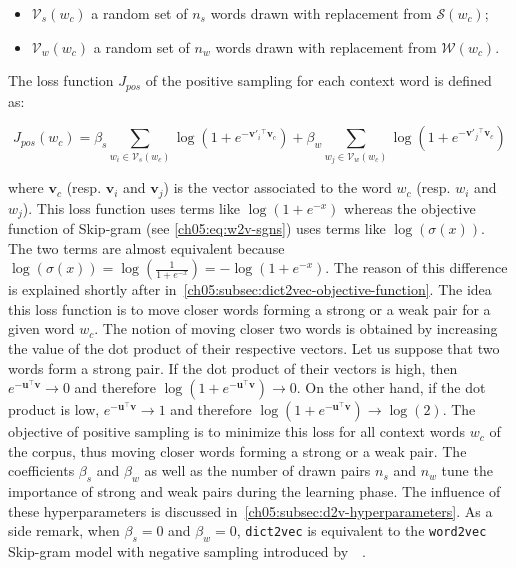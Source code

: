     \begin{itemize}
      \item $\mathcal{V}_s(w_c)$ a random set of $n_s$ words drawn with
        replacement from $\mathcal{S}(w_c)$;
      \item $\mathcal{V}_w(w_c)$ a random set of $n_w$ words drawn with
        replacement from $\mathcal{W}(w_c)$.
    \end{itemize}
    \medskip

    The loss function $J_{pos}$ of the positive sampling for each context word
    is defined as:

    \begin{equation}
      \label{ch05:eq:positive-sampling}
      J_{pos}(w_c) = \beta_{s} \sum_{w_i \in \mathcal{V}_s(w_c)}
                         \log(1 + e^{-\mathbf{v'}_{i} {}^\top \mathbf{v}_{c}})
                     + \beta_{w} \sum_{w_j \in \mathcal{V}_w(w_c)}
                         \log(1 + e^{-\mathbf{v'}_{j} {}^\top \mathbf{v}_{c}})
    \end{equation}

    \noindent where $\mathbf{v}_c$ (resp. $\mathbf{v}_i$ and $\mathbf{v}_j$) is
    the vector associated to the word $w_c$ (resp. $w_i$ and $w_j$). This loss
    function uses terms like $\log(1 + e^{-x})$ whereas the objective function
    of Skip-gram (see \autoref{ch05:eq:w2v-sgns}) uses terms like
    $\log(\sigma(x))$. The two terms are almost equivalent because
    $\log(\sigma(x)) = \log(\frac{1}{1 + e^{-x}}) = - \log(1 + e^{-x})$. The
    reason of this difference is explained shortly after
    in~\autoref{ch05:subsec:dict2vec-objective-function}. The idea this loss
    function is to move closer words forming a strong or a weak pair for a given
    word $w_c$. The notion of moving closer two words is obtained by increasing
    the value of the dot product of their respective vectors. Let us suppose
    that two words form a strong pair. If the dot product of their vectors is
    high, then $e^{-\mathbf{u}{}^\top \mathbf{v}} \to 0$ and therefore $\log(1 +
    e^{-{\mathbf{u}}{}^\top \mathbf{v}}) \to 0$. On the other hand, if the dot
    product is low, $e^{-{\mathbf{u}}{}^\top \mathbf{v}} \to 1$ and therefore
    $\log(1 + e^{-{\mathbf{u}}{}^\top \mathbf{v}}) \to \log(2)$. The objective
    of positive sampling is to minimize this loss for all context words $w_c$ of
    the corpus, thus moving closer words forming a strong or a weak pair. The
    coefficients $\beta_s$ and $\beta_w$ as well as the number of drawn pairs
    $n_s$ and $n_w$ tune the importance of strong and weak pairs during the
    learning phase. The influence of these hyperparameters is discussed
    in~\autoref{ch05:subsec:d2v-hyperparameters}. As a side remark, when
    $\beta_s = 0$ and $\beta_w = 0$, \texttt{dict2vec} is equivalent to the
    \texttt{word2vec} Skip-gram model with negative sampling introduced
    by~\citeauthor{mikolov2013efficient}~\citep{mikolov2013efficient}.

